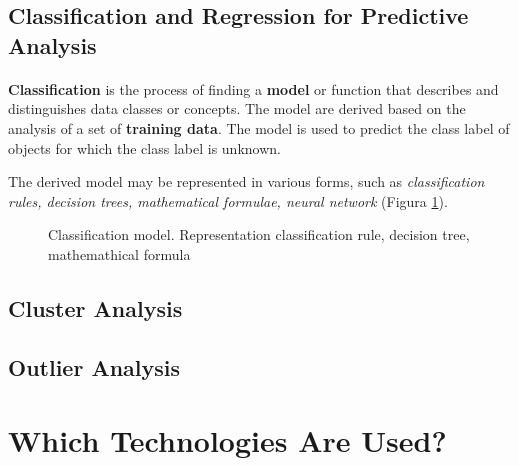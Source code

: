 \documentclass{book}
\begin{document}
    \subsection{Classification and Regression for Predictive Analysis}\label{sec:classification}
    \paragraph{}
    \textbf{Classification} is the process of finding a \textbf{model} or function that describes and distinguishes data classes or concepts. The model are derived based on the analysis of a set of \textbf{training data}. The model is used to predict the class label of objects for which the class label is unknown.

    The derived model may be represented in various forms, such as \textit{classification rules, decision trees, mathematical formulae, neural network} (Figura \ref{fig:classification}).

    \begin{figure}[H]\label{fig:classification}
        \centering
        
        \caption{Classification model. Representation classification rule, decision tree, mathemathical formula}
    \end{figure}

    \subsection{Cluster Analysis}\label{sec:cluster}
    \paragraph{}

    \subsection{Outlier Analysis}\label{sec:outlier}
    \paragraph{}

    \section{Which Technologies Are Used?}
    \paragraph{}
   
\end{document}
